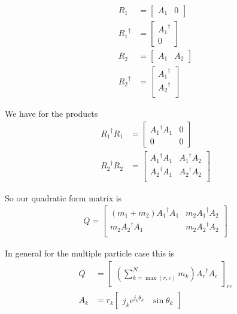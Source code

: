 \begin{align}\label{eqn:sPolarMultiPendulum:zoo13}
R_1 &= 
\begin{bmatrix}
A_1 & 0
\end{bmatrix} \\
{R_1}^\dagger &= 
\begin{bmatrix}
{A_1}^\dagger \\
0
\end{bmatrix} \\
R_2 &= 
\begin{bmatrix}
A_1 & A_2
\end{bmatrix} \\
{R_2}^\dagger &= 
\begin{bmatrix}
{A_1}^\dagger \\
{A_2}^\dagger \\
\end{bmatrix} 
\end{align}

We have for the products
\begin{align}\label{eqn:sPolarMultiPendulum:zoo14}
{R_1}^\dagger R_1 &=
\begin{bmatrix}
{A_1}^\dagger A_1 & 0 \\
0 & 0
\end{bmatrix} \\
{R_2}^\dagger R_2 &=
\begin{bmatrix}
{A_1}^\dagger A_1 & {A_1}^\dagger A_2 \\
{A_2}^\dagger A_1 & {A_2}^\dagger A_2 \\
\end{bmatrix} 
\end{align}

So our quadratic form matrix is
\begin{align}\label{eqn:sPolarMultiPendulum:zoo15}
Q =
\begin{bmatrix}
(m_1 + m_2) {A_1}^\dagger A_1 & m_2 {A_1}^\dagger A_2 \\
m_2 {A_2}^\dagger A_1 & m_2 {A_2}^\dagger A_2 \\
\end{bmatrix} 
\end{align}

In general for the multiple particle case this is
\begin{align}\label{eqn:sPolarMultiPendulum:zoo16}
Q &=
{\begin{bmatrix}
\left(\sum_{k=\max(r,c)}^N m_k \right) {A_r}^\dagger A_c
\end{bmatrix}}_{rc} \\
A_k &= r_k 
\begin{bmatrix}
j_k e^{j_k \theta_k} & \sin\theta_k
\end{bmatrix}
\end{align}

